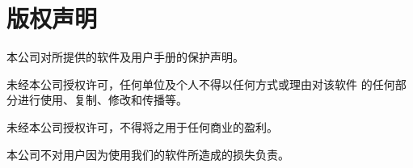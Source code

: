 \chapter{版权声明}
\par 本公司对所提供的软件及用户手册的保护声明。
\par 未经本公司授权许可，任何单位及个人不得以任何方式或理由对该软件
的任何部分进行使用、复制、修改和传播等。
\par 未经本公司授权许可，不得将之用于任何商业的盈利。
\par 本公司不对用户因为使用我们的软件所造成的损失负责。
